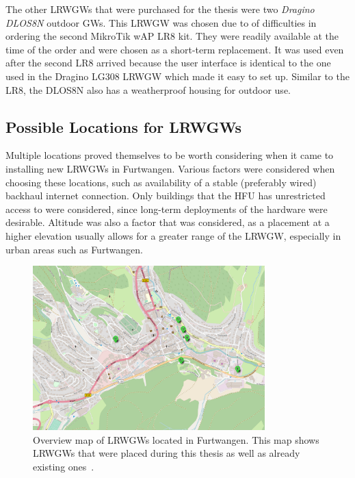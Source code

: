 The other \aclp{LRWGW} that were purchased for the thesis were two \emph{Dragino DLOS8N} outdoor \aclp{GW}.
This \acl{LRWGW} was chosen due to of difficulties in ordering the second MikroTik wAP LR8 kit.
They were readily available at the time of the order and were chosen as a short-term replacement.
It was used even after the second LR8 arrived because the user interface is identical to the one used in the Dragino LG308 \acl{LRWGW} which made it easy to set up.
Similar to the LR8, the DLOS8N also has a weatherproof housing for outdoor use.

\subsection{Possible Locations for \aclp{LRWGW}}\label{sec:gateway-locations}

Multiple locations proved themselves to be worth considering when it came to installing new \aclp{LRWGW} in Furtwangen.
Various factors were considered when choosing these locations, such as availability of a stable (preferably wired) backhaul internet connection.
Only buildings that the \ac{HFU} has unrestricted access to were considered, since long-term deployments of the hardware were desirable.
Altitude was also a factor that was considered, as a placement at a higher elevation usually allows for a greater range of the \acl{LRWGW}, especially in urban areas such as Furtwangen.

\begin{figure}[htbp]
    \centering
    \includegraphics[width=0.8\textwidth]{pictures/hardware/gateway-deployment/gateway_deployment_map.png}
    \caption{
        Overview map of \aclp{LRWGW} located in Furtwangen.
        This map shows \aclp{LRWGW} that were placed during this thesis as well as already existing ones~\cite{ttn_mapper_ttn_2023}.
    }\label{pic:gateways-placement-map}
\end{figure}

